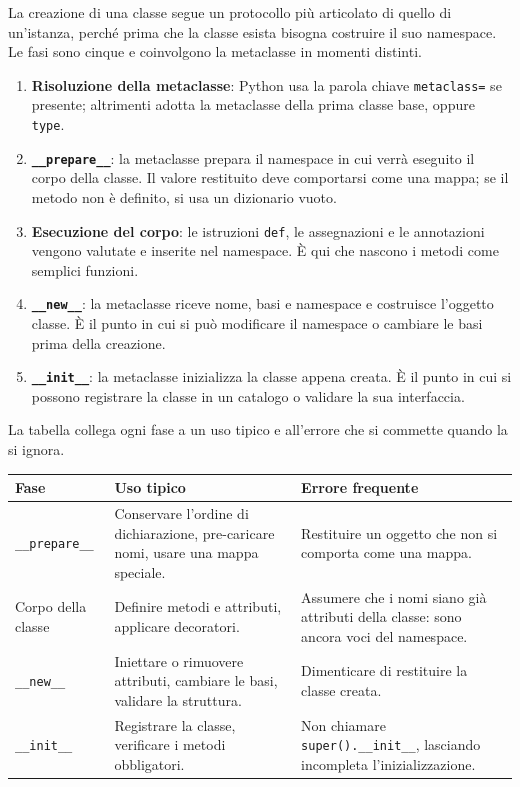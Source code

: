 \documentclass[12pt]{extarticle}
\begin{document}
\noindent La creazione di una classe segue un protocollo più articolato di quello di un'istanza, perché prima che la classe esista bisogna costruire il suo namespace. Le fasi sono cinque e coinvolgono la metaclasse in momenti distinti.

\begin{enumerate}
    \item \textbf{Risoluzione della metaclasse}: Python usa la parola chiave \texttt{metaclass=} se presente; altrimenti adotta la metaclasse della prima classe base, oppure \texttt{type}.
    \item \textbf{\texttt{\_\_prepare\_\_}}: la metaclasse prepara il namespace in cui verrà eseguito il corpo della classe. Il valore restituito deve comportarsi come una mappa; se il metodo non è definito, si usa un dizionario vuoto.
    \item \textbf{Esecuzione del corpo}: le istruzioni \texttt{def}, le assegnazioni e le annotazioni vengono valutate e inserite nel namespace. È qui che nascono i metodi come semplici funzioni.
    \item \textbf{\texttt{\_\_new\_\_}}: la metaclasse riceve nome, basi e namespace e costruisce l'oggetto classe. È il punto in cui si può modificare il namespace o cambiare le basi prima della creazione.
    \item \textbf{\texttt{\_\_init\_\_}}: la metaclasse inizializza la classe appena creata. È il punto in cui si possono registrare la classe in un catalogo o validare la sua interfaccia.
\end{enumerate}

\noindent La tabella collega ogni fase a un uso tipico e all'errore che si commette quando la si ignora.

\begin{center}
\small
\begin{tabular}{p{3.6cm}p{6.2cm}p{4.6cm}}
    \toprule
    \textbf{Fase} & \textbf{Uso tipico} & \textbf{Errore frequente} \\
    \midrule
    \texttt{\_\_prepare\_\_} & Conservare l'ordine di dichiarazione, pre-caricare nomi, usare una mappa speciale. & Restituire un oggetto che non si comporta come una mappa. \\
    \addlinespace
    Corpo della classe & Definire metodi e attributi, applicare decoratori. & Assumere che i nomi siano già attributi della classe: sono ancora voci del namespace. \\
    \addlinespace
    \texttt{\_\_new\_\_} & Iniettare o rimuovere attributi, cambiare le basi, validare la struttura. & Dimenticare di restituire la classe creata. \\
    \addlinespace
    \texttt{\_\_init\_\_} & Registrare la classe, verificare i metodi obbligatori. & Non chiamare \texttt{super().\_\_init\_\_}, lasciando incompleta l'inizializzazione. \\
    \bottomrule
\end{tabular}
\end{center}
\end{document}
